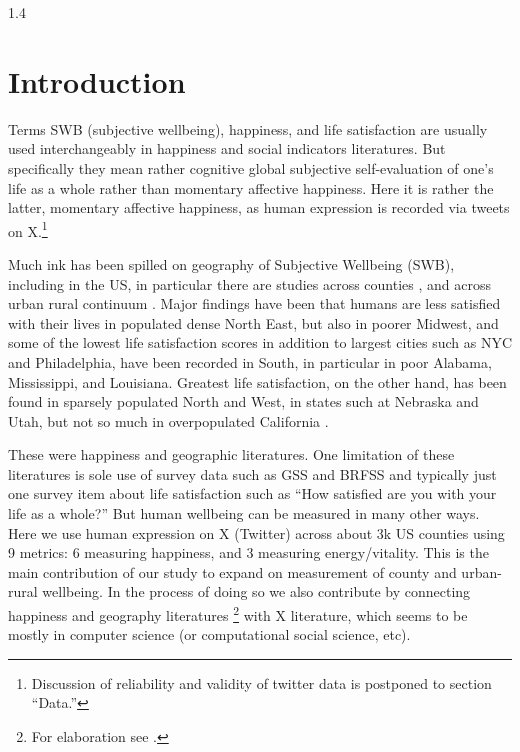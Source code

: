 \documentclass[10pt, letterpaper]{article}
\begin{document}
\begin{spacing}{1.4} %

\section{Introduction}


Terms SWB (subjective wellbeing), happiness, and life satisfaction are usually used
  interchangeably in happiness and social indicators
  literatures. But specifically they mean rather
  cognitive global subjective self-evaluation of one's life as a whole rather
  than momentary affective happiness. Here it is rather the latter, momentary
  affective happiness, as human expression is recorded via tweets on
  X.\footnote{Discussion of reliability and validity of twitter data  is postponed to section ``Data.''}
  
Much ink has been spilled on geography of Subjective Wellbeing
(SWB), including in the US, in particular there are studies across counties
\cite[e.g.,][]{aok_brfss_city_cize16,winters15,growShrink25}, and across urban
rural continuum \citep{aok24swls,swbUrbRurPsid21,aok20}. Major findings have
been that humans are less satisfied with their lives in populated dense North
East, but also in poorer Midwest, and some of the lowest life satisfaction
scores in addition to largest cities such as NYC and Philadelphia, have been
recorded in South, in particular in poor Alabama, Mississippi, and
Louisiana. Greatest life satisfaction, on the other hand, has been found in sparsely
populated North and West, in states such at Nebraska and Utah, but not so much in
overpopulated California \citep{schkade98k}. 

These were happiness and geographic literatures. One limitation of these
literatures is sole use of survey data such as GSS and BRFSS and typically just
one survey item about life satisfaction such as ``How satisfied are you with
your life as a whole?'' But human wellbeing can be measured in many other
ways. Here we use human expression on X (Twitter) across about 3k US counties
using 9 metrics: 6 measuring happiness,
and 3 measuring energy/vitality. This is the main contribution of our study to
expand on measurement of county and urban-rural wellbeing. In the process of
doing so we also contribute by connecting happiness and geography 
literatures \citep[summarized in][]{swbUrbRurPsid21,aok20}\footnote{For
  elaboration see \citet{ballas23,ziogas23,weckroth22,ziogas20,ballas13,knies26,sorensen24,sorensen14,lenzi22,lenzi20,lenzi16,lenzi16B,lenzi16D}.} with X literature,
which seems to be mostly in computer science (or computational social science, etc).



\end{spacing}
\end{document}
